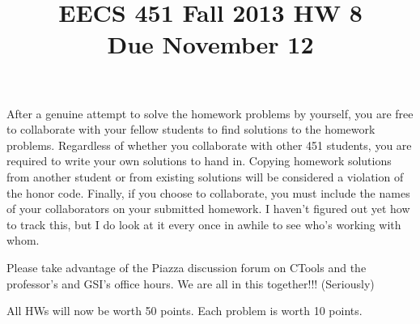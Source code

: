 \documentclass[11pt]{article}
\title{EECS 451 Fall 2013 HW 8 \\
 \hspace{1.2cm} Due November 12}
\date{}
\begin{document}
%
\maketitle

After a genuine attempt to solve the homework problems by yourself, you are free to collaborate with your fellow students to find solutions to the homework problems. Regardless of whether you collaborate with other 451 students, you are required to write your own solutions to hand in. Copying homework solutions from another student or from existing solutions will be considered a violation of the honor code. Finally, if you choose to collaborate, you must include the names of your collaborators on your submitted homework. I haven't figured out yet how to track this, but I do look at it every once in awhile to see who's working with whom.

\vspace{2mm} 

Please take advantage of the Piazza discussion forum on CTools and the professor's and GSI's office hours. We are all in this together!!! (Seriously)


\vspace{2mm}
All HWs will now be worth 50 points. Each problem is worth 10 points.

\vspace{5mm}
\end{document}
